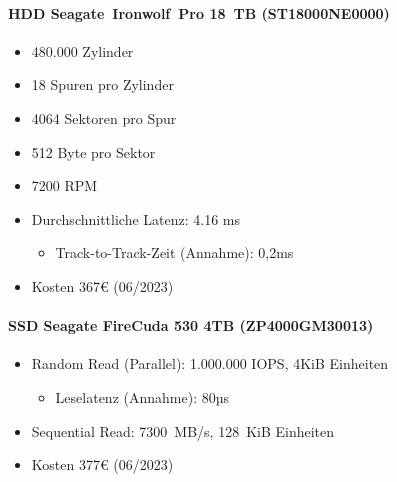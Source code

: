 \begin{minipage}[t]{0.55\linewidth}
	\paragraph{HDD Seagate~Ironwolf~Pro 18~TB (ST18000NE0000)}
	\begin{itemize}
		\item 480.000 Zylinder
		\item 18 Spuren pro Zylinder
		\item 4064 Sektoren pro Spur
		\item 512 Byte pro Sektor
		\item 7200 RPM
		\item Durchschnittliche Latenz: 4.16 ms
		\begin{itemize}
			\item Track-to-Track-Zeit (Annahme): 0,2ms
		\end{itemize}
		\item Kosten 367€ (06/2023)

	\end{itemize}
\end{minipage}
\hfill
\begin{minipage}[t]{0.35\linewidth}
	\paragraph{SSD Seagate FireCuda 530 4TB (ZP4000GM30013)}
	\begin{itemize}
		\item Random Read (Parallel): 1.000.000 IOPS, 4KiB Einheiten
		\begin{itemize}
			\item Leselatenz (Annahme): 80µs
		\end{itemize}
		\item Sequential Read: 7300~MB/s, 128~KiB Einheiten
		\item Kosten 377€ (06/2023)
	\end{itemize}
\end{minipage}



